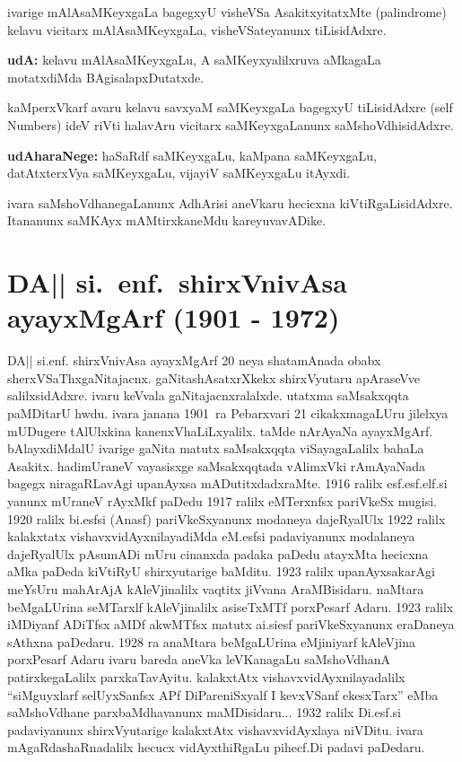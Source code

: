 ivarige mAlAsaMKeyxgaLa bagegxyU visheVSa AsakitxyitatxMte {\rm (palindrome)}
kelavu vicitarx mAlAsaMKeyxgaLa, visheVSateyanunx tiLisidAdxre.

\textbf{udA:} kelavu mAlAsaMKeyxgaLu, A saMKeyxyalilxruva aMkagaLa motatxdiMda BAgisalapx\-Dutatxde.

kaMperxVkarf avaru kelavu savxyaM saMKeyxgaLa bagegxyU tiLisidAdxre {\rm (self Numbers)}
 ideV riVti halavAru vicitarx saMKeyxgaLanunx saMshoVdhisidAdxre. 

\textbf{udAharaNege:} haSaRdf saMKeyxgaLu, kaMpana saMKeyxgaLu, datAtxterxVya saMKeyxgaLu, vijayiV saMKeyxgaLu itAyxdi.

ivara saMshoVdhanegaLanunx AdhArisi aneVkaru hecicxna kiVtiRgaLisidAdxre. Itananunx saMKAyx mAMtirxkaneMdu kareyuvavADike.

\section{{\protect\bf DA|| si.~enf.\ shirxVnivAsa ayayxMgArf {\rm (1901 - 1972)}}}

DA|| si.enf. shirxVnivAsa ayayxMgArf {\rm 20} neya shatamAnada obabx sherxVSaThxgaNitajacnx. gaNita\-shAsatxrXkekx shirxVyutaru apAraseVve salilxsidAdxre. ivaru keVvala gaNitajacnxralalxde. utatxma saMsakxqqta paMDitarU hwdu. ivara janana {\rm 1901}~ra Pebarxvari {\rm 21} cikakxmagaLUru jilelxya mUDugere tAlUlxkina kanenxVhaLiLxyalilx. taMde nArAyaNa ayayxMgArf. bAlayx\-diMdalU ivarige gaNita matutx saMsakxqqta viSayagaLalilx bahaLa Asakitx. hadimUraneV vayasisxge saMsakxqq\-tada vAlimxVki rAmAyaNada bagegx niragaRLavAgi upanAyxsa mADutitxdadxraMte. {\rm 1916} ralilx esf.esf.elf.si yanunx mUraneV rAyxMkf paDedu {\rm 1917} ralilx eMTerxnfsx pariVkeSx mugisi. {\rm 1920} ralilx bi.esfsi (Anasf) pariVkeSxyanunx modaneya dajeRyalUlx {\rm 1922} ralilx kalakxtatx vishavxvidAyxnilayadiMda eM.esfsi padaviyanunx modalaneya dajeRyalUlx pAsumADi mUru cinanxda padaka paDedu atayxMta hecicxna aMka paDeda kiVtiRyU shirxyutarige baMditu. {\rm 1923} ralilx upanAyxsakarAgi meYsUru mahArAjA kAleVjinalilx vaqtitx jiVvana AraMBisidaru. naMtara beMgaLUrina seMTarxlf kAleVjinalilx asiseTxMTf porxPesarf Adaru. {\rm 1923} ralilx iMDiyanf ADiTfsx aMDf akwMTfsx matutx ai.siesf pariVkeSxyanunx eraDaneya sAthxna paDedaru. {\rm 1928} ra anaMtara beMgaLUrina eMjiniyarf kAleVjina porxPesarf Adaru ivaru bareda aneVka leVKanagaLu saMshoVdhanA patirxkegaLalilx parxkaTavAyitu. kalakxtAtx vishavxvidAyxnilayadalilx ``siMguyxlarf selUyxSanfsx APf DiPareniSxyalf I kevxVSanf ekesxTarx'' eMba saMshoVdhane parxbaMdhavanunx maMDisidaru$\ldots$ {\rm 1932} ralilx Di.esf.si padaviyanunx shirxVyutarige kalakxtAtx vishavxvidAyxlaya niVDitu. ivara mAgaRdashaRnadalilx hecucx vidAyxthiRgaLu pihecf.Di padavi paDedaru.

